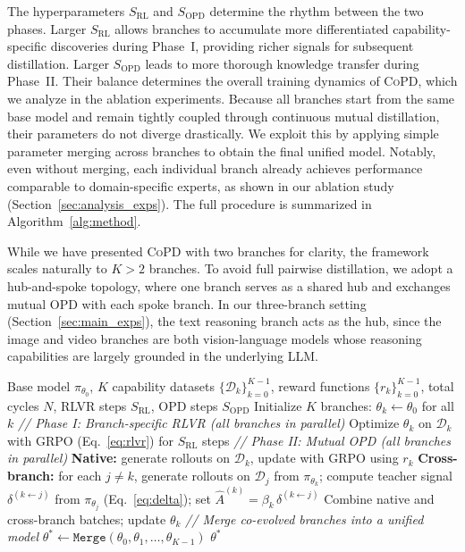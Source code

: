 \documentclass{llmxive}
\providecommand{\method}{\textsc{CoPD}\xspace}
\providecommand{\fullmethod}{Co-Evolving Policy Distillation\xspace}
\begin{document}
The hyperparameters $S_{\mathrm{RL}}$ and $S_{\mathrm{OPD}}$ determine the rhythm between the two phases. Larger $S_{\mathrm{RL}}$ allows branches to accumulate more differentiated capability-specific discoveries during Phase~I, providing richer signals for subsequent distillation. Larger $S_{\mathrm{OPD}}$ leads to more thorough knowledge transfer during Phase~II. Their balance determines the overall training dynamics of \method, which we analyze in the ablation experiments. Because all branches start from the same base model and remain tightly coupled through continuous mutual distillation, their parameters do not diverge drastically. We exploit this by applying simple parameter merging across branches to obtain the final unified model. Notably, even without merging, each individual branch already achieves performance comparable to domain-specific experts, as shown in our ablation study (Section~\ref{sec:analysis_exps}). The full procedure is summarized in Algorithm~\ref{alg:method}.

While we have presented \method with two branches for clarity, the framework scales naturally to $K > 2$ branches. To avoid full pairwise distillation, we adopt a hub-and-spoke topology, where one branch serves as a shared hub and exchanges mutual OPD with each spoke branch. In our three-branch setting (Section~\ref{sec:main_exps}), the text reasoning branch acts as the hub, since the image and video branches are both vision-language models whose reasoning capabilities are largely grounded in the underlying LLM.

\begin{algorithm}[t]
\caption{\method: \fullmethod}
\label{alg:method}
\begin{algorithmic}[1]
\Require Base model $\pi_{\theta_0}$, $K$ capability datasets $\{\mathcal{D}_k\}_{k=0}^{K-1}$, reward functions $\{r_k\}_{k=0}^{K-1}$, total cycles $N$, RLVR steps $S_{\mathrm{RL}}$, OPD steps $S_{\mathrm{OPD}}$
\State Initialize $K$ branches: $\theta_k \gets \theta_0$ for all $k$
    \State \textit{// Phase I: Branch-specific RLVR (all branches in parallel)}
        \State Optimize $\theta_k$ on $\mathcal{D}_k$ with GRPO (Eq.~\ref{eq:rlvr}) for $S_{\mathrm{RL}}$ steps
    \EndFor
    \State \textit{// Phase II: Mutual OPD (all branches in parallel)}
            \State \textbf{Native:} generate rollouts on $\mathcal{D}_k$, update with GRPO using $r_k$
            \State \textbf{Cross-branch:} for each $j \neq k$, generate rollouts on $\mathcal{D}_j$ from $\pi_{\theta_k}$; compute teacher signal $\delta^{(k \leftarrow j)}$ from $\pi_{{\theta}_j}$ (Eq.~\ref{eq:delta}); set $\hat{A}^{(k)} = \beta_k \, \delta^{(k \leftarrow j)}$
            \State Combine native and cross-branch batches; update $\theta_k$
        \EndFor
    \EndFor
\EndFor
\State \textit{// Merge co-evolved branches into a unified model}
\State $\theta^* \gets \texttt{Merge}(\theta_0, \theta_1, \dots, \theta_{K-1})$
\State \Return $\theta^*$
\end{algorithmic}
\end{algorithm}
\end{document}

